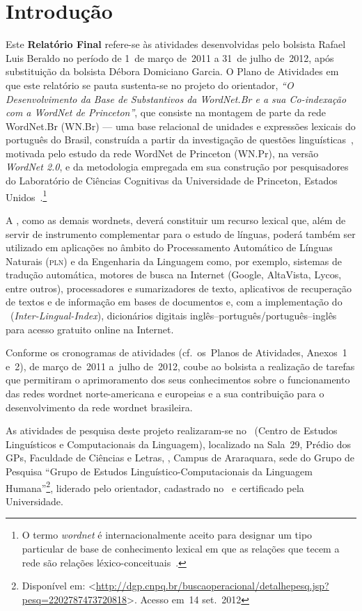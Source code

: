 \chapter{Introdução}

Este \textbf{Relatório Final} refere-se às atividades desenvolvidas pelo
bolsista Rafael Luis Beraldo no período de 1\textordmasculine~de março de~2011
a 31~de julho de~2012, após substituição da bolsista Débora Domiciano Garcia. O
Plano de Atividades em que este relatório se pauta sustenta-se no projeto do
orientador, \textit{``O Desenvolvimento da Base de Substantivos da WordNet.Br e
a sua Co-indexação com a WordNet de Princeton''}, que consiste na montagem de
parte da rede WordNet.Br (WN.Br) --- uma base relacional de unidades e
expressões lexicais do português do Brasil, construída a partir da investigação
de questões linguísticas~\cite{bentoetal,bento}, motivada pelo estudo da rede
WordNet de Princeton (WN.Pr), na versão \textit{WordNet 2.0}, e da metodologia
empregada em sua construção por pesquisadores do Laboratório de Ciências
Cognitivas da Universidade de Princeton, Estados
Unidos~\cite{miller,fellbaum}.\footnote{O termo \textit{wordnet} é
internacionalmente aceito para designar um tipo particular de base de
conhecimento lexical em que as relações que tecem a rede são relações
léxico-conceituais~\cite{marrafa}.} 

A \wnbr, como as demais wordnets, deverá constituir um recurso lexical que,
além de servir de instrumento complementar para o estudo de línguas, poderá
também ser utilizado em aplicações no âmbito do Processamento Automático de
Línguas Naturais (\textsc{pln}) e da Engenharia da Linguagem como, por exemplo,
sistemas de tradução automática, motores de busca na Internet (Google,
AltaVista, Lycos, entre outros), processadores e sumarizadores de texto,
aplicativos de recuperação de textos e de informação em bases de documentos e,
com a implementação do
\ili~(\foreignlanguage{english}{\textit{Inter-Lingual-Index}}), dicionários
digitais inglês--português/português--inglês para acesso gratuito online na
Internet.

Conforme os cronogramas de atividades (cf.~os~Planos de Atividades, Anexos~1
e~2), de março de~2011 a~julho de~2012, coube ao bolsista a realização de
tarefas que permitiram o aprimoramento dos seus conhecimentos sobre o
funcionamento das redes wordnet norte-americana e europeias e a sua
contribuição para o desenvolvimento da rede wordnet brasileira.

As atividades de pesquisa deste projeto realizaram-se no \celic\ (Centro de
Estudos Linguísticos e Computacionais da Linguagem), localizado na Sala~29,
Prédio dos GPs, Faculdade de Ciências e Letras, \unesp, Campus de Araraquara,
sede do Grupo de Pesquisa ``Grupo de Estudos Linguístico-Computacionais da
Linguagem Humana''\footnote{Disponível em:
<\url{http://dgp.cnpq.br/buscaoperacional/detalhepesq.jsp?pesq=2202787473720818}>.
Acesso em~14 set.~2012}, liderado pelo orientador, cadastrado no \cnpq\ e
certificado pela Universidade.

